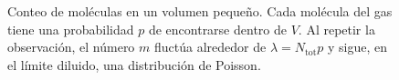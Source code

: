 {\begin{figure}[htbp]
    \caption{Conteo de moléculas en un volumen pequeño. Cada molécula del gas
    tiene una probabilidad $p$ de encontrarse dentro de $V$. Al repetir la
    observación, el número $m$ fluctúa alrededor de $\lambda=N_{\mathrm{tot}}p$
    y sigue, en el límite diluido, una distribución de Poisson.}
    \label{fig:taller-poisson-volumen}
\end{figure}%
}